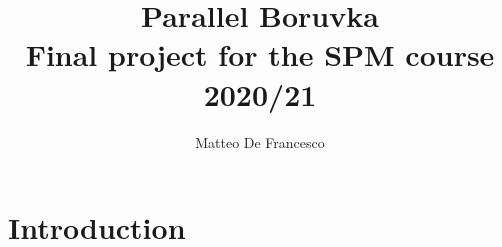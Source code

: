 \documentclass[notitlepage]{article}
\title{Parallel Boruvka\\{\normalsize Final project for the SPM course 2020/21}}
\author{Matteo De Francesco}
\date{}
\begin{document}
\maketitle

\thispagestyle{empty}

\tableofcontents

\newpage


\section{Introduction}
\end{document}
